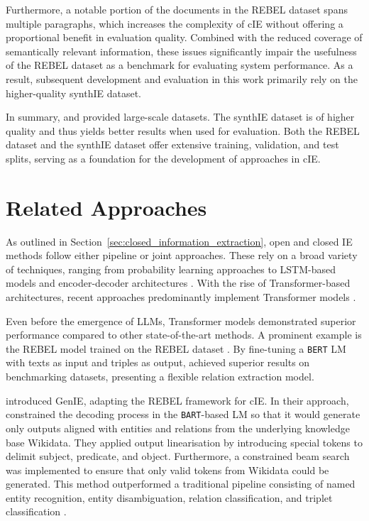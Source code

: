 \documentclass[a4paper,oneside,bibliography=totoc]{scrbook}
\begin{document}
Furthermore, a notable portion of the documents in the REBEL dataset spans multiple paragraphs, which increases the complexity of \ac{cIE} without offering a proportional benefit in evaluation quality. Combined with the reduced coverage of semantically relevant information, these issues significantly impair the usefulness of the REBEL dataset as a benchmark for evaluating system performance. As a result, subsequent development and evaluation in this work primarily rely on the higher-quality synthIE dataset.

In summary, \citet{HuguetCabot2021} and \citet{Josifoski2023} provided large-scale datasets. The synthIE dataset is of higher quality and thus yields better results when used for evaluation. Both the REBEL dataset and the synthIE dataset offer extensive training, validation, and test splits, serving as a foundation for the development of approaches in \ac{cIE}.

\section{Related Approaches}
\label{sec:related_approaches}

As outlined in Section~\ref{sec:closed_information_extraction}, open and closed \ac{IE} methods follow either pipeline or joint approaches. These rely on a broad variety of techniques, ranging from probability learning approaches to LSTM-based models and encoder-decoder architectures \cite{Zhang2022,Angeli2015,Trisedya2019}. With the rise of Transformer-based architectures, recent approaches predominantly implement Transformer models \cite{Josifoski2021,Josifoski2023,Moeller2024}.

Even before the emergence of \acp{LLM}, Transformer models demonstrated superior performance compared to other state-of-the-art methods. A prominent example is the REBEL model trained on the REBEL dataset \cite{HuguetCabot2021}. By fine-tuning a \texttt{BERT} \ac{LM} with texts as input and triples as output, \citet{HuguetCabot2021} achieved superior results on benchmarking datasets, presenting a flexible relation extraction model.

\citet{Josifoski2021} introduced GenIE, adapting the REBEL framework for \ac{cIE}. In their approach, \citet{Josifoski2021} constrained the decoding process in the \texttt{BART}-based \ac{LM} so that it would generate only outputs aligned with entities and relations from the underlying knowledge base Wikidata. They applied output linearisation by introducing special tokens to delimit subject, predicate, and object. Furthermore, a constrained beam search was implemented to ensure that only valid tokens from Wikidata could be generated. This method outperformed a traditional pipeline consisting of named entity recognition, entity disambiguation, relation classification, and triplet classification \cite{Josifoski2021}.
\end{document}
